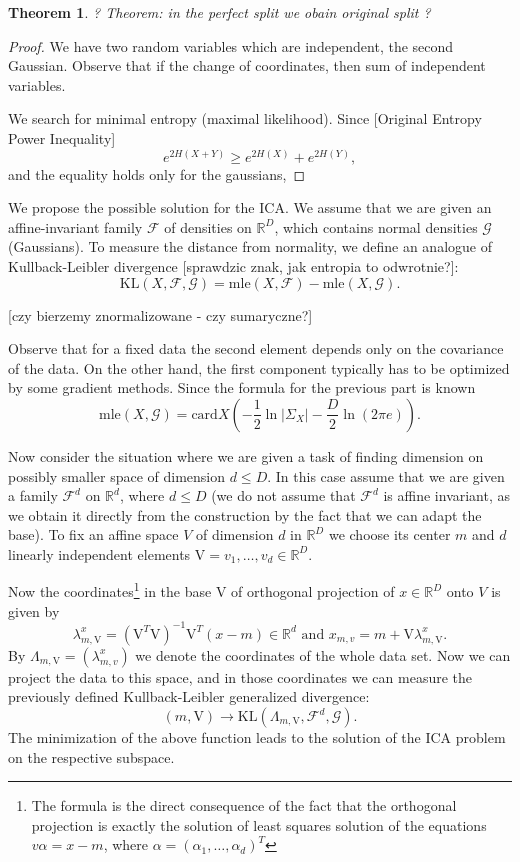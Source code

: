 \documentclass[12pt]{article}
\def\R{\mathbb{R}}
\def\v{\mathrm{V}}
\def\F{\mathcal{F}}
\def\G{\mathcal{G}}
\def\KL{\mathrm{KL}}
\def\mle{\mathrm{mle}}
\def\card{\mathrm{card}}
\newtheorem{theorem}{Theorem}[section]
\theoremstyle{definition}
\begin{document}
\begin{theorem}
? Theorem: in the perfect split we obain original split ?
\end{theorem}

\begin{proof}
We have two random variables which are independent, the second Gaussian.
Observe that if the change of coordinates, then sum of independent variables.

We search for minimal entropy (maximal likelihood). Since
[Original Entropy Power Inequality]
$$
e^{2H(X+Y)} \geq e^{2H(X)}+e^{2H(Y)},
$$
and the equality holds only for the gaussians, 
\end{proof}

We propose the possible solution for the ICA. We assume that we are given an affine-invariant family
$\F$ of densities on $\R^D$, which contains normal densities $\G$ (Gaussians). To measure the distance from 
normality, we define an analogue of Kullback-Leibler divergence [sprawdzic znak, jak entropia to odwrotnie?]:
$$
\KL(X,\F,\G)=\mle(X,\F)-\mle(X,\G).
$$

[czy bierzemy znormalizowane - czy sumaryczne?]

Observe that for a fixed data the second element depends only on the covariance of the data. On the other hand, the first component typically has to be optimized by some gradient methods. Since the formula for the previous part is known
$$
\mle(X,\G)=\card X(-\frac{1}{2}\ln |\Sigma_X|-\frac{D}{2}\ln(2\pi e)).
$$

Now consider the situation where we are given a task of finding dimension on possibly smaller space of dimension $d \leq D$.
In this case assume that we are given a family $\F^d$ on $\R^d$, where $d \leq D$ (we do not assume that $\F^d$ is affine invariant, as we obtain it directly from the construction by the fact that we can adapt the base).
To fix an affine space $V$ of dimension $d$ in $\R^D$ we choose its center $m$
and $d$ linearly independent elements $\v=v_1,\ldots,v_d \in \R^D$.

Now the coordinates\footnote{The formula is the direct consequence of the fact that the orthogonal projection is exactly the solution of least squares solution of the equations 
$v \alpha=x-m$, where $\alpha=(\alpha_1,\ldots,\alpha_d)^T$} in the base $\v$ of orthogonal projection of $x \in \R^D$ onto $V$ is given by
\begin{equation} \label{eq:coord}
\lambda_{m,\v}^x=(\v^T\v)^{-1}\v^T(x-m) \in \R^d \text{ and }
x_{m,v}=m+\v\lambda_{m,\v}^x.
\end{equation}
By $\Lambda_{m,\v}=(\lambda^x_{m,v})$ we denote the coordinates of the whole data set.
Now we can project the data to this space, and in those coordinates we can measure
the previously defined Kullback-Leibler generalized divergence:
\begin{equation} \label{eq:KL}
(m,\v) \to \KL(\Lambda_{m,\v},\F^d,\G).
\end{equation}
The minimization of the above function leads to the solution of the ICA
problem on the respective subspace.
\end{document}
